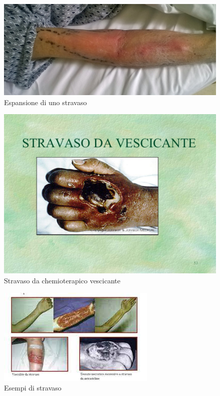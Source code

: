 \begin{figure}[H]
    \begin{center}
    \includegraphics[width=0.5\columnwidth]{img/stravaso.jpeg}
    \end{center}
    \caption[Espansione di uno stravaso]{Espansione di uno stravaso
    \cite{img54}}

\end{figure}

\begin{figure}[H]
    \begin{center}
    \includegraphics[width=0.5\columnwidth]{img/STRAVASOVESCICANTE.jpeg}
    \end{center}
    \caption[Stravaso da chemioterapico vescicante]{Stravaso da chemioterapico vescicante
    \cite{img55}}

\end{figure}

\begin{figure}[H]
    \begin{center}
    \includegraphics[width=0.5\columnwidth]{img/stravaso1.jpeg}
    \end{center}
    \caption[Esempi di stravaso]{Esempi di stravaso
    \cite{img56}}

\end{figure}

